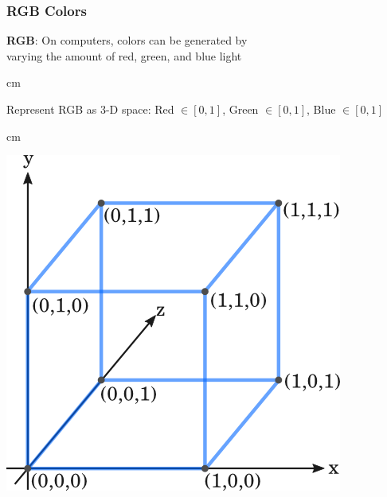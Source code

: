 \documentclass{beamer} %
\begin{document}
\begin{frame}\frametitle{RGB Colors}
	\small
	\centering
	
	\textbf{RGB}:  On computers, colors can be generated by \\varying the amount of red, green, and blue light
	
	
	 cm
	
	Represent RGB as 3-D space:  Red $\in [0,1]$, Green $\in [0,1]$, Blue $\in [0,1]$
	
	 cm
	
	\includegraphics[width=0.55\linewidth]{xyzcube}
	
\end{frame}
\end{document}
